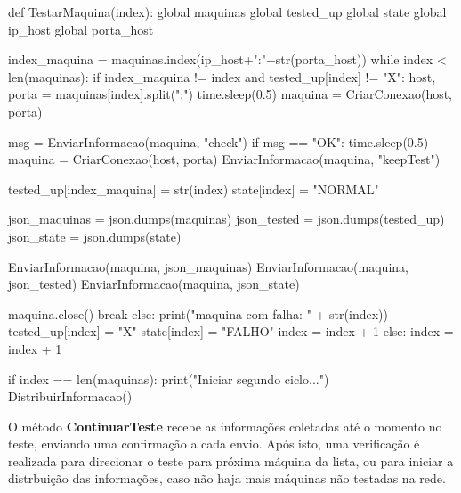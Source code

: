 \vspace*{1cm}
\begin{python}
def TestarMaquina(index):
    global maquinas
    global tested_up
    global state
    global ip_host
    global porta_host

    index_maquina = maquinas.index(ip_host+":"+str(porta_host))
    while index < len(maquinas):
        if index_maquina != index and tested_up[index] != "X":
            host, porta = maquinas[index].split(":")
            time.sleep(0.5)
            maquina = CriarConexao(host, porta)

            msg = EnviarInformacao(maquina, "check")
            if msg == "OK":
                time.sleep(0.5)
                maquina = CriarConexao(host, porta)
                EnviarInformacao(maquina, "keepTest")

                tested_up[index_maquina] = str(index)
                state[index] = "NORMAL"

                json_maquinas = json.dumps(maquinas)
                json_tested = json.dumps(tested_up)
                json_state = json.dumps(state)
                
                EnviarInformacao(maquina, json_maquinas)
                EnviarInformacao(maquina, json_tested)
                EnviarInformacao(maquina, json_state)

                maquina.close()
                break
            else:
                print("maquina com falha: " + str(index))
                tested_up[index] = "X"
                state[index] = "FALHO"
                index = index + 1
        else:
            index = index + 1

    if index == len(maquinas):
        print("Iniciar segundo ciclo...")
        DistribuirInformacao()
\end{python}
\vspace*{1cm}

O método \textbf{ContinuarTeste} recebe as informações coletadas até o momento no teste, enviando uma confirmação a cada envio. Após isto, uma verificação é realizada para direcionar 
o teste para próxima máquina da lista, ou para iniciar a distrbuição das informações, caso não haja mais máquinas não testadas na rede.

